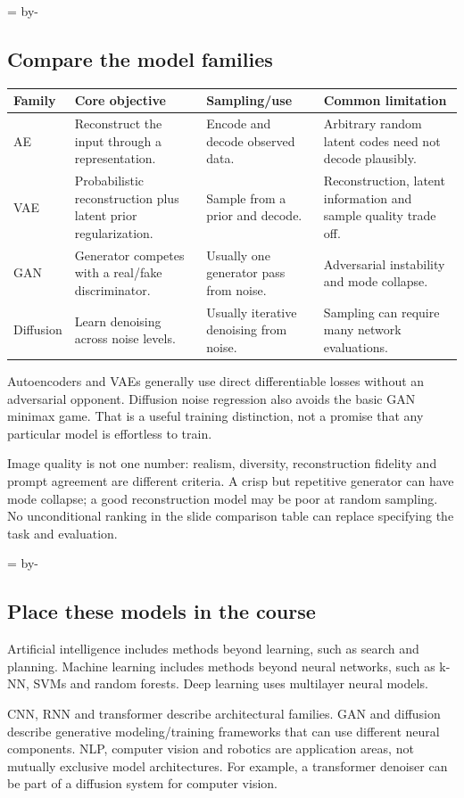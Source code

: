 \documentclass[11pt]{article}
\newcommand{\newsubsection}[1]{\par\begingroup\skip0=\pagegoal\advance\skip0 by-\pagetotal\ifdim\skip0<12\baselineskip\newpage\fi\endgroup\subsection{#1}}
\begin{document}
\newsubsection{Compare the model families}
\begin{longtable}{@{}P{.14\textwidth}P{.27\textwidth}P{.24\textwidth}P{.25\textwidth}@{}}
\toprule Family & Core objective & Sampling/use & Common limitation\\\midrule\endhead
AE & Reconstruct the input through a representation. & Encode and decode observed data. & Arbitrary random latent codes need not decode plausibly.\\
VAE & Probabilistic reconstruction plus latent prior regularization. & Sample from a prior and decode. & Reconstruction, latent information and sample quality trade off.\\
GAN & Generator competes with a real/fake discriminator. & Usually one generator pass from noise. & Adversarial instability and mode collapse.\\
Diffusion & Learn denoising across noise levels. & Usually iterative denoising from noise. & Sampling can require many network evaluations.\\\bottomrule
\end{longtable}
Autoencoders and VAEs generally use direct differentiable losses without an adversarial opponent. Diffusion noise regression also avoids the basic GAN minimax game. That is a useful training distinction, not a promise that any particular model is effortless to train.

Image quality is not one number: realism, diversity, reconstruction fidelity and prompt agreement are different criteria. A crisp but repetitive generator can have mode collapse; a good reconstruction model may be poor at random sampling. No unconditional ranking in the slide comparison table can replace specifying the task and evaluation.

\newsubsection{Place these models in the course}
Artificial intelligence includes methods beyond learning, such as search and planning. Machine learning includes methods beyond neural networks, such as k-NN, SVMs and random forests. Deep learning uses multilayer neural models.

CNN, RNN and transformer describe architectural families. GAN and diffusion describe generative modeling/training frameworks that can use different neural components. NLP, computer vision and robotics are application areas, not mutually exclusive model architectures. For example, a transformer denoiser can be part of a diffusion system for computer vision.
\end{document}
